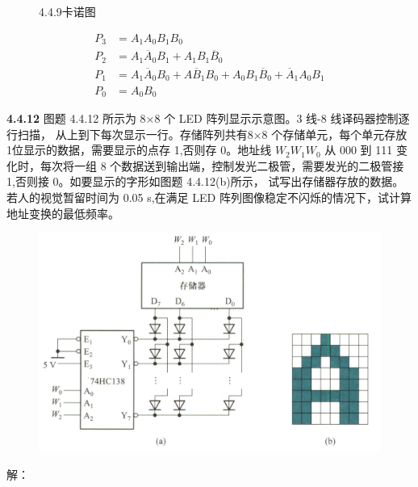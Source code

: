 \documentclass[a4paper,11pt,UTF8]{article}
\begin{document}
\begin{figure}[H]
	\centering
	\setcounter{subfigure}{0}
	\caption{4.4.9卡诺图}
\end{figure}
$$\begin{aligned}
	P_3&=A_1A_0B_1B_0\\
	P_2&=A_1\overline{A}_0B_1+A_1B_1\overline{B}_0\\
	P_1&=A_1\overline{A}_0B_0+A\overline{B}_1B_0+A_0B_1\overline{B}_0+\overline{A}_1A_0B_1\\
	P_0&=A_0B_0
\end{aligned}
$$

\textbf{4.4.12} 图题 4.4.12 所示为 8×8 个 LED 阵列显示示意图。3 线-8 线译码器控制逐行扫描， 从上到下每次显示一行。存储阵列共有8×8 个存储单元，每个单元存放 1位显示的数据，需要显示的点存 1,否则存 0。地址线 $W_2W_1W_0$ 从 000 到 111 变化时，每次将一组 8 个数据送到输出端，控制发光二极管，需要发光的二极管接 1,否则接 0。如要显示的字形如图题 4.4.12(b)所示， 试写出存储器存放的数据。若人的视觉暂留时间为 0.05 s,在满足 LED 阵列图像稳定不闪烁的情况下，试计算地址变换的最低频率。
\begin{figure}[H]
	\centering
	\includegraphics[width=1\textwidth]{4.4.12}
\end{figure}
解：
\end{document}
